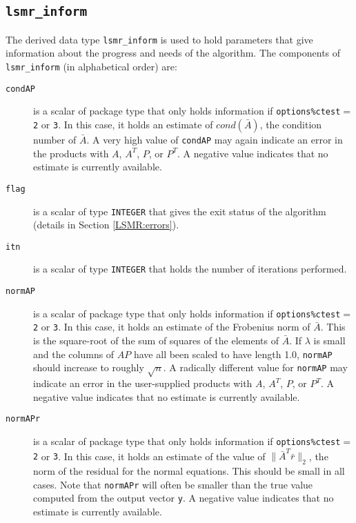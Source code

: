 
\subsection{\texttt{lsmr\_inform}}
\label{LSMR:type:inform}
The derived data type {\tt lsmr\_inform}
is used to hold parameters that give information about the progress and needs
of the algorithm. The components of {\tt lsmr\_inform}
(in alphabetical order) are:

\begin{description}

\item[\texttt{condAP}]  is a scalar of package type that
   only holds information if {\tt options\%ctest}$ =${\tt 2} or {\tt 3}.
   In this case, it holds an estimate of $cond(\bar{A})$, the condition
   number of $\bar{A}$.  A very high value of {\tt condAP}
   may again indicate an error in the products 
   with $A$, $A^T$, $P$, or $P^T$. A negative value indicates
   that no estimate is currently available.

\item[\texttt{flag}] is a scalar of type  {\tt INTEGER} that gives the exit
   status of the algorithm (details in Section \ref{LSMR:errors}).

\item[\texttt{itn}] is a scalar of type  {\tt INTEGER} that holds the number
   of iterations performed.

\item[\texttt{normAP}]  is a scalar of package type that
   only holds information if {\tt options\%ctest}$ =${\tt 2} or {\tt 3}.
   In this case, it holds an estimate of the Frobenius norm of $\bar{A}$.
   This is the square-root of the sum of squares of the elements of $\bar{A}$.
   If $\lambda$ is small and the columns of $AP$ have all been scaled to have 
   length 1.0, {\tt normAP} should increase to roughly $\sqrt{n}$.
   A radically different value for {\tt normAP} may
   indicate an error in the user-supplied
   products with $A$, $A^T$, $P$, or $P^T$. A negative value
   indicates that no estimate is currently available.

\item[\texttt{normAPr}]  is a scalar of package type that only holds information
   if {\tt options\%ctest}$ =${\tt 2} or {\tt 3}. In this case, it holds an
   estimate of the  value of $\| \bar{A}^T\bar{r}\|_2$, the norm of the residual
   for the normal equations. This should be small in all cases.  Note that
   {\tt normAPr}  will often be smaller than the true value computed from the
   output vector {\tt y}. A negative value indicates that no estimate is
   currently available.
    

\end{description}
